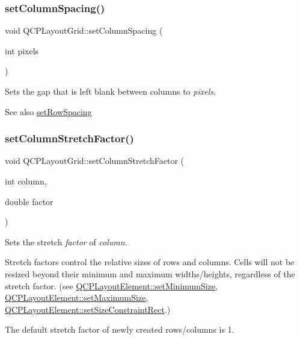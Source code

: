 \subsubsection{\texorpdfstring{set\+Column\+Spacing()}{setColumnSpacing()}}
{\footnotesize\ttfamily void Q\+C\+P\+Layout\+Grid\+::set\+Column\+Spacing (\begin{DoxyParamCaption}\item[{int}]{pixels }\end{DoxyParamCaption})}

Sets the gap that is left blank between columns to {\itshape pixels}.

\begin{DoxySeeAlso}{See also}
\hyperlink{classQCPLayoutGrid_aaef2cd2d456197ee06a208793678e436}{set\+Row\+Spacing} 
\end{DoxySeeAlso}
\mbox{\label{classQCPLayoutGrid_ae38f31a71687b9d7ee3104852528fb50}} 
\subsubsection{\texorpdfstring{set\+Column\+Stretch\+Factor()}{setColumnStretchFactor()}}
{\footnotesize\ttfamily void Q\+C\+P\+Layout\+Grid\+::set\+Column\+Stretch\+Factor (\begin{DoxyParamCaption}\item[{int}]{column,  }\item[{double}]{factor }\end{DoxyParamCaption})}

Sets the stretch {\itshape factor} of {\itshape column}.

Stretch factors control the relative sizes of rows and columns. Cells will not be resized beyond their minimum and maximum widths/heights, regardless of the stretch factor. (see \hyperlink{classQCPLayoutElement_a5dd29a3c8bc88440c97c06b67be7886b}{Q\+C\+P\+Layout\+Element\+::set\+Minimum\+Size}, \hyperlink{classQCPLayoutElement_a74eb5280a737ab44833d506db65efd95}{Q\+C\+P\+Layout\+Element\+::set\+Maximum\+Size}, \hyperlink{classQCPLayoutElement_a361666cdcc6fbfd37344cc44be746b0f}{Q\+C\+P\+Layout\+Element\+::set\+Size\+Constraint\+Rect}.)

The default stretch factor of newly created rows/columns is 1.


